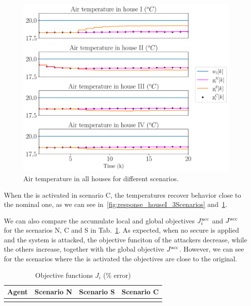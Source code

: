 \documentclass[../main.tex]{subfiles}
\begin{document}
\begin{figure}[h]
  \centering
 \includegraphics[width=.7\textwidth,trim=0 .3cm 0 .2cm,clip]{../img/resilient_eq/ErrorWX_command_normErrH_all_houses.pdf}
  \caption{Air temperature in all houses for different scenarios.}\label{fig:response_housesII_to_IV_3Scenarios}
\end{figure}

When the \rpdmpcss{} is activated in scenario C, the temperatures recover behavior close to the nominal one, as we can see in~\ref{fig:response_houseI_3Scenarios} and~\ref{fig:response_housesII_to_IV_3Scenarios}.


We can also compare the accumulate local and global objectives $J_{i}^{\text{acc}}$ and $J^{\text{acc}}$ for the scenarios N, C and S in Tab.~\ref{tab:eq_costsGlobalLocal}.
As expected, when no secure \dmpc{} is applied and the system is attacked, the objective funciton of the attackers decrease, while the others increase, together with the global objective $J^{\text{acc}}$.
However, we can see for the scenarios where the \rpdmpcss{} is activated the objectives are close to the original.

\begin{table}[h]
  \centering
  \caption{Objective functions $J_{i}$ (\% error)}\label{tab:eq_costsGlobalLocal}
  \begin{tabular}[t]{cccc}
    \toprule
    Agent  & Scenario N& Scenario S & Scenario C\\
    \midrule
    \\
    \bottomrule
  \end{tabular}
\end{table}
\end{document}
